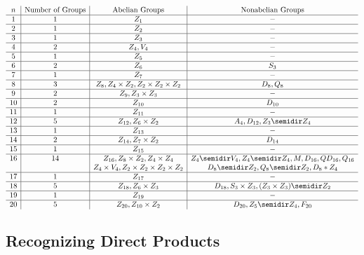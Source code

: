 \[
\begin{array}{c|c|c|c}
    n & \text{Number of Groups} & \text{Abelian Groups} & \text{Nonabelian Groups} \\
    \hline
    1 & 1 & Z_1 & - \\
    \hline
    2 & 1 & Z_2 & - \\
    \hline
    3 & 1 & Z_3 & - \\
    \hline
    4 & 2 & Z_4, V_4 & - \\
    \hline
    5 & 1 & Z_5 & - \\
    \hline
    6 & 2 & Z_6 & S_3 \\
    \hline
    7 & 1 & Z_7 & - \\
    \hline
    8 & 3 & Z_8, Z_4 \times Z_2, Z_2 \times Z_2 \times Z_2 & D_8, Q_8 \\
    \hline
    9 & 2 & Z_9, Z_3 \times Z_3 & - \\
    \hline
    10 & 2 & Z_{10} & D_{10} \\
    \hline
    11 & 1 & Z_{11} & - \\
    \hline
    12 & 5 & Z_{12}, Z_6 \times Z_2& A_4, D_{12}, Z_3 \semidir Z_4 \\
    \hline
    13 & 1 & Z_{13} & - \\
    \hline
    14 & 2 & Z_{14}, Z_{7} \times Z_{2} & D_{14} \\
    \hline
    15 & 1 & Z_{15} & - \\
    \hline
    16 & 14 & Z_{16}, Z_8 \times Z_2, Z_4 \times Z_4 & Z_4 \semidir V_4, Z_4 \semidir Z_4, M, D_{16}, QD_{16}, Q_{16} \\
    & & Z_4 \times V_4, Z_2 \times Z_2 \times Z_2 \times Z_2 & D_8 \semidir Z_2, Q_8 \semidir Z_2, D_8 * Z_4 \\
    \hline
    17 & 1 & Z_{17} & - \\
    \hline
    18 & 5 & Z_{18}, Z_6 \times Z_3 & D_{18}, S_3 \times Z_3, (Z_3 \times Z_3) \semidir Z_2 \\
    \hline
    19 & 1 & Z_{19} & - \\
    \hline
    20 & 5 & Z_{20}, Z_{10} \times Z_{2} & D_{20}, Z_5 \semidir Z_4, F_{20}
\end{array}\]

\subsection{Recognizing Direct Products}

